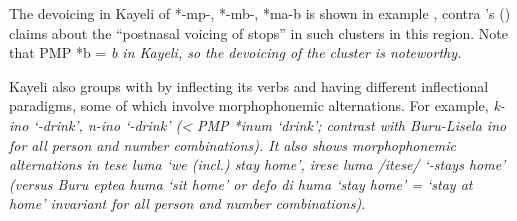 The devoicing in Kayeli of *-mp-,
*-mb-, *ma-b is shown in example ,
contra \citeauthor{Blust2009}'s (\citeyear[72]{Blust2009})
claims about the “postnasal voicing
of stops” in such clusters in this region.
Note that PMP *b = \it{b} in Kayeli,
so the devoicing of the cluster is noteworthy.


Kayeli also groups with  by inflecting its verbs
and having different inflectional paradigms,
some of which involve morphophonemic alternations.
For example, \it{k-ino} ‘-drink’,
\it{n-ino} ‘-drink’ (< PMP *inum ‘drink’; contrast with
Buru-Lisela \it{ino} for all person and number combinations).
It also shows morphophonemic alternations in \it{tese luma} ‘we (incl.)
stay home’, \it{irese luma} /i{\nbhyp}tese/ ‘-stays home’ (versus Buru
\it{eptea huma} ‘sit home’ or \it{defo di huma} ‘stay 
home’ = ‘stay at home’ invariant for all person and number combinations).

